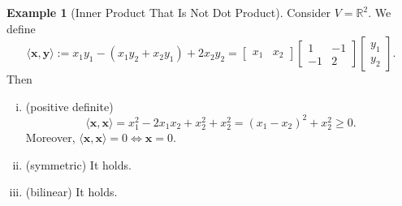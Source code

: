\documentclass[12pt,openany]{book}
\theoremstyle{definition}
\newtheorem{example}{Example}[chapter]
\newcommand{\R}{\mathbb{R}}
\newcommand{\inner}[1]{\langle #1\rangle}
\begin{document}
	\begin{example}[Inner Product That Is Not Dot Product]
		Consider \(V=\R^2\). We define \[
		\inner{\textbf{x},\textbf{y}}:=x_1y_1-(x_1y_2+x_2y_1)+2x_2y_2=
		\begin{bmatrix} x_1&x_2\end{bmatrix}
		\begin{bmatrix} 1 & -1\\ -1 &2\end{bmatrix}
		\begin{bmatrix} y_1\\y_2\end{bmatrix}.
		\] Then \begin{enumerate}[(i)]
			\item (positive definite) \[
			\inner{\textbf{x},\textbf{x}}=x_1^2-2x_1x_2+x_2^2+x_2^2=(x_1-x_2)^2+x_2^2\geq0.
			\] Moreover, \(\inner{\textbf{x},\textbf{x}}=0\iff\textbf{x}=0\).
			\item (symmetric) It holds.
			\item (bilinear) It holds.
		\end{enumerate}
	\end{example}
	
	\newpage
\end{document}
